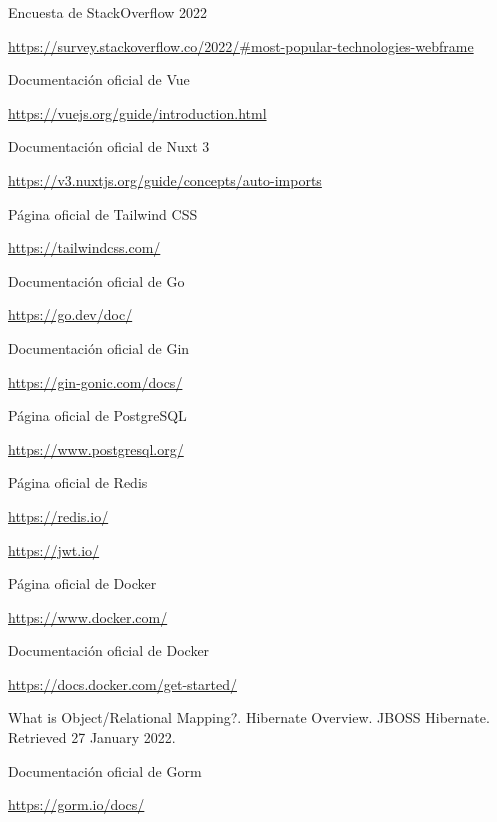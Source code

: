 \begin{thebibliography}{X}
	 Encuesta de StackOverflow 2022
	
	
	\url{https://survey.stackoverflow.co/2022/#most-popular-technologies-webframe}
	
 Documentación oficial de Vue

\url{https://vuejs.org/guide/introduction.html}

 Documentación oficial de Nuxt 3

\url{https://v3.nuxtjs.org/guide/concepts/auto-imports}

 Página oficial de Tailwind CSS

\url{https://tailwindcss.com/}

 Documentación oficial de Go

\url{https://go.dev/doc/}

 Documentación oficial de Gin

\url{https://gin-gonic.com/docs/}

 Página oficial de PostgreSQL

\url{https://www.postgresql.org/}

 Página oficial de Redis

\url{https://redis.io/}

 \url{https://jwt.io/}

 Página oficial de Docker

\url{https://www.docker.com/}

 Documentación oficial de Docker

\url{https://docs.docker.com/get-started/}

 What is Object/Relational Mapping?. Hibernate Overview. JBOSS Hibernate. Retrieved 27 January 2022.

 Documentación oficial de Gorm

\url{https://gorm.io/docs/}
	
\end{thebibliography}